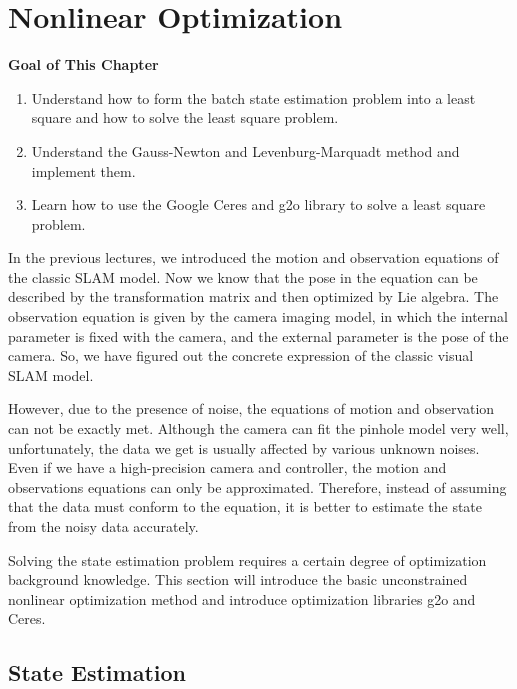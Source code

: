\chapter{Nonlinear Optimization}
\label{cpt:6}
\begin{mdframed}  
	\textbf{Goal of This Chapter}
	\begin{enumerate}[labelindent=0em,leftmargin=1.5em]
		\item Understand how to form the batch state estimation problem into a least square and how to solve the least square problem.
		\item Understand the Gauss-Newton and Levenburg-Marquadt method and implement them.
		\item Learn how to use the Google Ceres and g2o library to solve a least square problem.
	\end{enumerate}
\end{mdframed} 

In the previous lectures, we introduced the motion and observation equations of the classic SLAM model. Now we know that the pose in the equation can be described by the transformation matrix and then optimized by Lie algebra. The observation equation is given by the camera imaging model, in which the internal parameter is fixed with the camera, and the external parameter is the pose of the camera. So, we have figured out the concrete expression of the classic visual SLAM model.

However, due to the presence of noise, the equations of motion and observation can not be exactly met. Although the camera can fit the pinhole model very well, unfortunately, the data we get is usually affected by various unknown noises. Even if we have a high-precision camera and controller, the motion and observations equations can only be approximated. Therefore, instead of assuming that the data must conform to the equation, it is better to estimate the state from the noisy data accurately.

Solving the state estimation problem requires a certain degree of optimization background knowledge. This section will introduce the basic unconstrained nonlinear optimization method and introduce optimization libraries g2o and Ceres.

\newpage


\newpage
\section{State Estimation}
